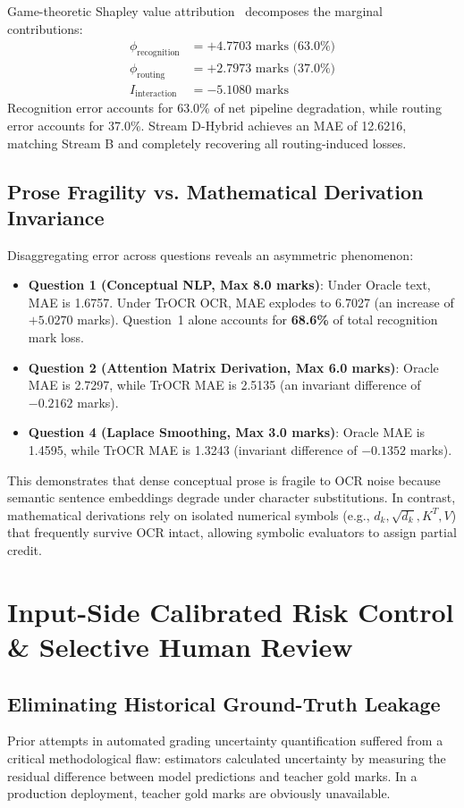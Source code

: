 \documentclass[journal]{IEEEtran}
\begin{document}
Game-theoretic Shapley value attribution~\cite{lundberg2017unified} decomposes the marginal contributions:
\begin{align}
\phi_{\text{recognition}} &= +4.7703\text{ marks (63.0\%)} \\
\phi_{\text{routing}} &= +2.7973\text{ marks (37.0\%)} \\
I_{\text{interaction}} &= -5.1080\text{ marks}
\end{align}
Recognition error accounts for 63.0\% of net pipeline degradation, while routing error accounts for 37.0\%. Stream D-Hybrid achieves an MAE of 12.6216, matching Stream B and completely recovering all routing-induced losses.

\subsection{Prose Fragility vs. Mathematical Derivation Invariance}
Disaggregating error across questions reveals an asymmetric phenomenon:
\begin{itemize}
    \item \textbf{Question 1 (Conceptual NLP, Max 8.0 marks)}: Under Oracle text, MAE is 1.6757. Under TrOCR OCR, MAE explodes to 6.7027 (an increase of $+5.0270$ marks). Question~1 alone accounts for \textbf{68.6\%} of total recognition mark loss.
    \item \textbf{Question 2 (Attention Matrix Derivation, Max 6.0 marks)}: Oracle MAE is 2.7297, while TrOCR MAE is 2.5135 (an invariant difference of $-0.2162$ marks).
    \item \textbf{Question 4 (Laplace Smoothing, Max 3.0 marks)}: Oracle MAE is 1.4595, while TrOCR MAE is 1.3243 (invariant difference of $-0.1352$ marks).
\end{itemize}
This demonstrates that dense conceptual prose is fragile to OCR noise because semantic sentence embeddings degrade under character substitutions. In contrast, mathematical derivations rely on isolated numerical symbols (e.g., $d_k, \sqrt{d_k}, K^T, V$) that frequently survive OCR intact, allowing symbolic evaluators to assign partial credit.

\section{Input-Side Calibrated Risk Control \& Selective Human Review}

\subsection{Eliminating Historical Ground-Truth Leakage}
Prior attempts in automated grading uncertainty quantification suffered from a critical methodological flaw: estimators calculated uncertainty by measuring the residual difference between model predictions and teacher gold marks. In a production deployment, teacher gold marks are obviously unavailable.
\end{document}
